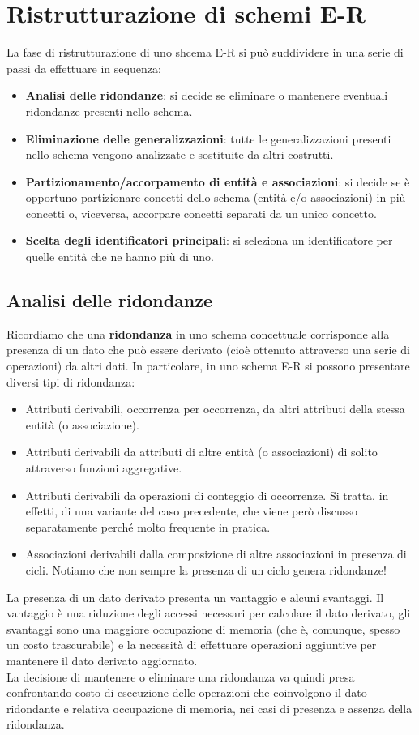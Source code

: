 \section{Ristrutturazione di schemi E-R}
La fase di ristrutturazione di uno shcema E-R si può suddividere in una serie di passi da effettuare in sequenza:
    \begin{itemize}
        \item{\textbf{Analisi delle ridondanze}: si decide se eliminare o mantenere eventuali ridondanze presenti nello schema.}
        \item{\textbf{Eliminazione delle generalizzazioni}: tutte le generalizzazioni presenti nello schema vengono analizzate e sostituite da altri costrutti.}
        \item{\textbf{Partizionamento/accorpamento di entità e associazioni}: si decide se è opportuno partizionare concetti dello schema (entità e/o associazioni) in più concetti o, viceversa, accorpare concetti separati da un unico concetto.}
        \item{\textbf{Scelta degli identificatori principali}: si seleziona un identificatore per quelle entità che ne hanno più di uno.}
    \end{itemize}
    
\subsection{Analisi delle ridondanze}
Ricordiamo che una \textbf{ridondanza} in uno schema concettuale corrisponde alla presenza di un dato che può essere derivato (cioè ottenuto attraverso una serie di operazioni) da altri dati. In particolare, in uno schema E-R si possono presentare diversi tipi di ridondanza:
    \begin{itemize}
        \item{Attributi derivabili, occorrenza per occorrenza, da altri attributi della stessa entità (o associazione).}
        \item{Attributi derivabili da attributi di altre entità (o associazioni) di solito attraverso funzioni aggregative.}
        \item{Attributi derivabili da operazioni di conteggio di occorrenze. Si tratta, in effetti, di una variante del caso precedente, che viene però discusso separatamente perché molto frequente in pratica.}
        \item{Associazioni derivabili dalla composizione di altre associazioni in presenza di cicli. Notiamo che non sempre la presenza di un ciclo genera ridondanze!}
    \end{itemize}
La presenza di un dato derivato presenta un vantaggio e alcuni svantaggi. Il vantaggio è una riduzione degli accessi necessari per calcolare il dato derivato, gli svantaggi sono una maggiore occupazione di memoria (che è, comunque, spesso un costo trascurabile) e la necessità di effettuare operazioni aggiuntive per mantenere il dato derivato aggiornato.\\
La decisione di mantenere o eliminare una ridondanza va quindi presa confrontando costo di esecuzione delle operazioni che coinvolgono il dato ridondante e relativa occupazione di memoria, nei casi di presenza e assenza della ridondanza.

